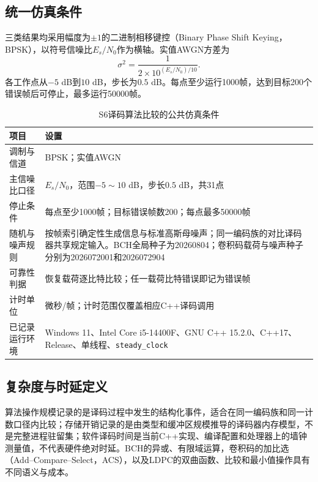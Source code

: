 \subsection{统一仿真条件}

三类结果均采用幅度为$\pm1$的二进制相移键控（Binary Phase Shift Keying，BPSK），以符号信噪比$E_s/N_0$作为横轴。实值AWGN方差为
\begin{equation}
  \sigma^2=\frac{1}{2\times10^{(E_s/N_0)/10}} .
\end{equation}
各工作点从$-5$ dB到$10$ dB，步长为$0.5$ dB。每点至少运行1000帧，达到目标200个错误帧后可停止，最多运行50000帧。

\begin{table}[htbp]
  \centering
  \small
  \caption{S6译码算法比较的公共仿真条件}
  \label{tab:s6-common-settings}
  \begin{tabular}{p{}p{}}
    \toprule
    项目 & 设置 \\
    \midrule
    调制与信道 & BPSK；实值AWGN \\
    主信噪比口径 & $E_s/N_0$，范围$-5\sim10$ dB，步长$0.5$ dB，共31点 \\
    停止条件 & 每点至少1000帧；目标错误帧数200；每点最多50000帧 \\
    随机与噪声规则 & 按帧索引确定性生成信息与标准高斯母噪声；同一编码族的对比译码器共享规定输入。BCH全局种子为20260804；卷积码载荷与噪声种子分别为2026072001和2026072904 \\
    可靠性判据 & 恢复载荷逐比特比较；任一载荷比特错误即记为错误帧 \\
    计时单位 & 微秒/帧；计时范围仅覆盖相应C++译码调用 \\
    已记录运行环境 & Windows 11、Intel Core i5-14400F、GNU C++ 15.2.0、C++17、Release、单线程、\texttt{steady\_clock} \\
    \bottomrule
  \end{tabular}
\end{table}

\subsection{复杂度与时延定义}

算法操作规模记录的是译码过程中发生的结构化事件，适合在同一编码族和同一计数口径内比较；存储开销记录的是由类型和缓冲区规模推导的译码器内存模型，不是完整进程驻留集；软件译码时间是当前C++实现、编译配置和处理器上的墙钟测量值，不代表硬件绝对时延。BCH的异或、有限域运算，卷积码的加比选（Add--Compare--Select，ACS），以及LDPC的双曲函数、比较和最小值操作具有不同语义与成本。

